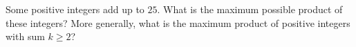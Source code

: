 Some positive integers add up to $25$. What is the maximum possible product of these integers? More generally, what is the maximum product of positive integers with sum $k\ge2$?
